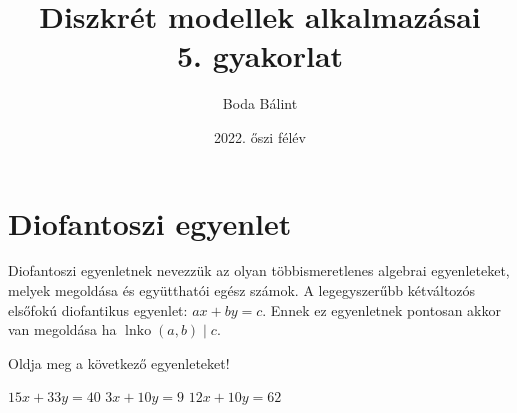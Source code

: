 \documentclass[a4paper,12pt]{article}
\title{\huge{Diszkrét modellek alkalmazásai} \\ \large 5. gyakorlat}
\author{Boda Bálint}
\date{2022. őszi félév}
\DeclareMathOperator{\lnko}{lnko}
\theoremstyle{definition}
\begin{document}
	\maketitle
	\section{Diofantoszi egyenlet}
	Diofantoszi egyenletnek nevezzük az olyan többismeretlenes algebrai egyenleteket, melyek megoldása és együtthatói egész számok. A legegyszerűbb kétváltozós elsőfokú diofantikus egyenlet: $ ax + by = c $. Ennek ez egyenletnek pontosan akkor van megoldása ha $ \lnko(a, b) \mid c $.
	\begin{question}
		Oldja meg a következő egyenleteket!
		\begin{tasks}
			\task $15x + 33y = 40$
			\task $3x + 10y = 9 $
			\task $12x + 10y = 62$
		\end{tasks}
	\end{question}
\end{document}
